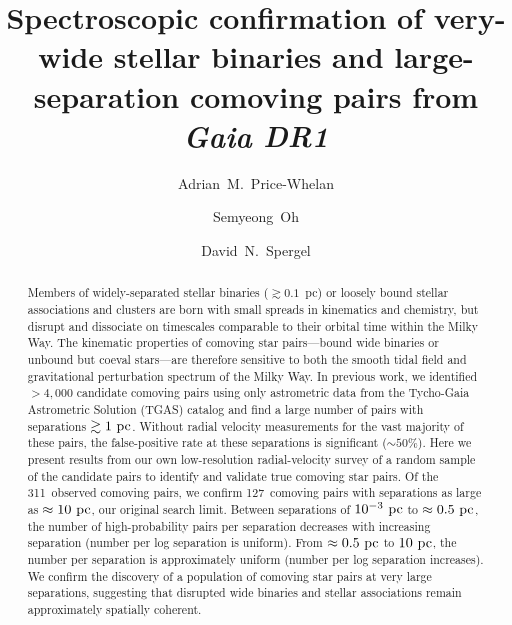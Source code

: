 \documentclass[modern, letterpaper]{aastex61}
\newcommand{\npairsobs}{311}
\newcommand{\ncomoving}{127}
\begin{document}
\sloppy\sloppypar\raggedbottom\frenchspacing %

\title{Spectroscopic confirmation of very-wide stellar binaries and
       large-separation comoving pairs from \textsl{Gaia DR1}}

\author[0000-0003-0872-7098]{Adrian~M.~Price-Whelan}

\author[0000-0001-7790-5308]{Semyeong~Oh}

\author[0000-0002-5151-0006]{David~N.~Spergel}




\begin{abstract}
Members of widely-separated stellar binaries ($\gtrsim 0.1$~pc) or loosely bound
stellar associations and clusters are born with small spreads in kinematics and
chemistry, but disrupt and dissociate on timescales comparable to their orbital
time within the Milky Way.
The kinematic properties of comoving star pairs---bound wide binaries or unbound
but coeval stars---are therefore sensitive to both the smooth tidal field and
gravitational perturbation spectrum of the Milky Way.
In previous work, we identified $>4,000$ candidate comoving pairs using only
astrometric data from the Tycho-Gaia Astrometric Solution (TGAS) catalog and
find a large number of pairs with separations $\gtrsim 1~\mathrm{pc}$.
Without radial velocity measurements for the vast majority of these pairs, the
false-positive rate at these separations is significant ($\sim 50\%$).
Here we present results from our own low-resolution radial-velocity survey of a
random sample of the candidate pairs to identify and validate true comoving star
pairs.
Of the \npairsobs\ observed comoving pairs, we confirm \ncomoving\ comoving
pairs with separations as large as $\approx 10~\mathrm{pc}$, our original search limit.
Between separations of $10^{-3}~\mathrm{pc}$ to $\approx 0.5~\mathrm{pc}$,
the number of high-probability pairs per separation decreases with increasing
separation (number per log separation is uniform).
From $\approx 0.5~\mathrm{pc}$ to $10~\mathrm{pc}$, the number per separation is approximately
uniform (number per log separation increases).
We confirm the discovery of a population of comoving star pairs at very large
separations, suggesting that disrupted wide binaries and stellar associations
remain approximately spatially coherent.
\end{abstract}
\end{document}
